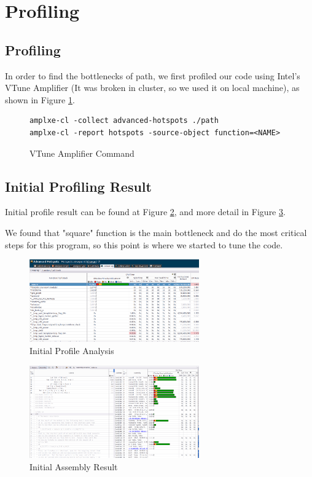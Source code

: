 \section{Profiling}
\label{sec:profile}
\subsection{Profiling}
In order to find the bottlenecks of path, we first profiled our code
using Intel's VTune Amplifier (It was broken in cluster, so we used
it on local machine), as shown in Figure \ref{amplxe-command}.

\vspace{0.3cm}

\begin{figure}[H]
\footnotesize
\begin{verbatim}
amplxe-cl -collect advanced-hotspots ./path
amplxe-cl -report hotspots -source-object function=<NAME>
\end{verbatim}
\caption{VTune Amplifier Command}
\label{amplxe-command}
\end{figure}

\subsection{Initial Profiling Result}
Initial profile result can be found at Figure \ref{initial_profile_result_0},
and more detail in Figure \ref{initial_profile_result_1}.

We found that "square" function is the main bottleneck and do the most critical
steps for this program, so this point is where we started to tune the code.

\begin{figure}[H]
    \centering
    \includegraphics[width=0.65\textwidth]{figs/0_analysis.png}
    \caption{Initial Profile Analysis}
    \label{initial_profile_result_0}
\end{figure}

\begin{figure}[H]
    \centering
    \includegraphics[width=0.65\textwidth]{figs/0_assembly.png}
    \caption{Initial Assembly Result}
    \label{initial_profile_result_1}
\end{figure}


